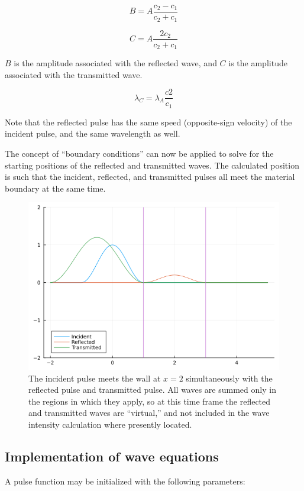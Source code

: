 \documentclass[twocolumn, letterpaper]{article}
\begin{document}
\begin{equation}
B = A\frac{c_2-c_1}{c_2+c_1}
\end{equation}

\begin{equation}
C = A\frac{2c_2}{c_2+c_1}
\end{equation}

$B$ is the amplitude associated with the reflected wave, and $C$ is the amplitude associated with the transmitted wave. 

\begin{equation}
\lambda_C = \lambda_A \frac{c2}{c_1}
\end{equation}

Note that the reflected pulse has the same speed (opposite-sign velocity) of the incident pulse, and the same wavelength as well.

The concept of ``boundary conditions'' can now be applied to solve for the starting positions of the reflected and transmitted waves. The calculated position is such that the incident, reflected, and transmitted pulses all meet the material boundary at the same time.

\begin{figure}
\includegraphics[width=\columnwidth]{Thing6}
\caption{The incident pulse meets the wall at $x=2$ simultaneously with the reflected pulse and transmitted  pulse. All waves are summed only in the regions in which they apply, so at this time frame the reflected and transmitted waves are ``virtual,'' and not included in the wave intensity calculation where presently located. }
\label{fig:pulse-timing}
\end{figure}

\subsection{Implementation of wave equations}
A pulse function may be initialized with the following parameters:
\end{document}
